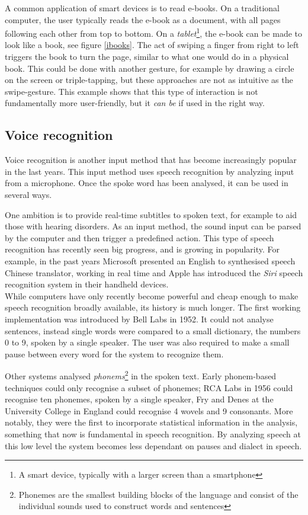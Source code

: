 A common application of smart devices is to read e-books. On a traditional computer, the user typically reads the e-book as a document, with all pages following each other from top to bottom. On a \emph{tablet}\footnote{A smart device, typically with a larger screen than a smartphone}, the e-book can be made to look like a book, see figure \ref{ibooks}. The act of swiping a finger from right to left triggers the book to turn the page, similar to what one would do in a physical book. This could be done with another gesture, for example by drawing a circle on the screen or triple-tapping, but these approaches are not as intuitive as the swipe-gesture. This example shows that this type of interaction is not fundamentally more user-friendly, but it \emph{can be} if used in the right way. 

\subsection{Voice recognition}

Voice recognition is another input method that has become increasingly popular in the last years. This input method uses speech recognition by analyzing input from a microphone. Once the spoke word has been analysed, it can be used in several ways.

One ambition is to provide real-time subtitles to spoken text, for example to aid those with hearing disorders. As an input method, the sound input can be parsed by the computer and then trigger a predefined action. This type of speech recognition has recently seen big progress, and is growing in popularity. For example, in the past years Microsoft presented an English to synthesised speech Chinese translator, working in real time and Apple has introduced the \emph{Siri} speech recognition system in their handheld devices.\\

While computers have only recently become powerful and cheap enough to make speech recognition broadly available, its history is much longer. The first working implementation was introduced by Bell Labs in 1952\cite{Davis52}. It could not analyse sentences, instead single words were compared to a small dictionary, the numbers 0 to 9, spoken by a single speaker\cite{juang}. The user was also required to make a small pause between every word for the system to recognize them.

Other systems analysed \emph{phonems}\footnote{Phonemes are the smallest building blocks of the language and consist of the individual sounds used to construct words and sentences} in the spoken text. Early phonem-based techniques could only recognise a subset of phonemes; RCA Labs in 1956 could recognise ten phonemes, spoken by a single speaker, Fry and Denes at the University College in England could recognise 4 wovels and 9 consonants. More notably, they were the first to incorporate statistical information in the analysis\cite{juang}, something that now is fundamental in speech recognition. By analyzing speech at this low level the system becomes less dependant on pauses and dialect in speech.

